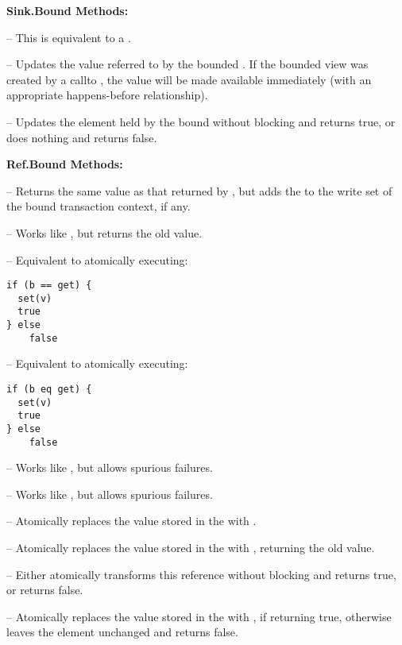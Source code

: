 \textbf{Sink.Bound Methods:}
\begin{packed_itemize}
\item {} -- This is equivalent to a .
\item {} -- Updates the value referred to by the bounded . 
If the bounded view was created by a callto , the value will be made available
immediately (with an appropriate happens-before relationship).
\item {} -- Updates the element held by the bound  without blocking 
and returns true, or does nothing and returns false.
\end{packed_itemize}

\textbf{Ref.Bound Methods:}
\begin{packed_itemize}
\item {} -- Returns the same value as that returned by , but
adds the  to the write set of the bound transaction context, if any.
\item {} -- Works like , but returns the old value. 
\item {} -- Equivalent to atomically executing:
\lstset{numbers=none}
\begin{lstlisting}
if (b == get) { 
  set(v) 
  true 
} else 
    false
\end{lstlisting}
\item {} -- Equivalent 
to atomically executing: 
\lstset{numbers=none}
\begin{lstlisting}
if (b eq get) { 
  set(v) 
  true 
} else 
    false
\end{lstlisting}
\item {} -- Works like 
, but allows spurious failures.
\item {} -- Works like 
, but allows spurious failures.
\item {} -- Atomically replaces the value  stored in the 
with .
\item {} -- Atomically replaces the value  stored in the 
with , returning the old value.
\item {} -- Either atomically transforms this reference without 
blocking and returns true, or returns false.
\item {} -- Atomically replaces 
the value  stored in the  with ,
if  returning true, otherwise leaves the element unchanged and returns false.
\end{packed_itemize}



